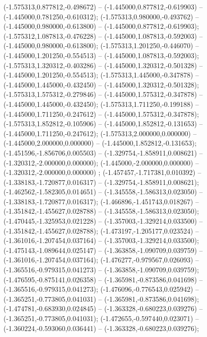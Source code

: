  (-1.575313,0.877812,-0.498672) -- (-1.445000,0.877812,-0.619903) -- (-1.445000,0.781250,-0.610312);
 (-1.575313,0.980000,-0.493762) -- (-1.445000,0.980000,-0.613800) -- (-1.445000,0.877812,-0.619903);
 (-1.575312,1.087813,-0.476228) -- (-1.445000,1.087813,-0.592003) -- (-1.445000,0.980000,-0.613800);
 (-1.575313,1.201250,-0.446070) -- (-1.445000,1.201250,-0.554513) -- (-1.445000,1.087813,-0.592003);
 (-1.575313,1.320312,-0.403286) -- (-1.445000,1.320312,-0.501328) -- (-1.445000,1.201250,-0.554513);
 (-1.575313,1.445000,-0.347878) -- (-1.445000,1.445000,-0.432450) -- (-1.445000,1.320312,-0.501328);
 (-1.575313,1.575312,-0.279846) -- (-1.445000,1.575312,-0.347878) -- (-1.445000,1.445000,-0.432450);
 (-1.575313,1.711250,-0.199188) -- (-1.445000,1.711250,-0.247612) -- (-1.445000,1.575312,-0.347878);
 (-1.575313,1.852812,-0.105906) -- (-1.445000,1.852812,-0.131653) -- (-1.445000,1.711250,-0.247612);
 (-1.575313,2.000000,0.000000) -- (-1.445000,2.000000,0.000000) -- (-1.445000,1.852812,-0.131653);
 (-1.451596,-1.856706,0.005503) -- (-1.329754,-1.858911,0.008621) -- (-1.320312,-2.000000,0.000000);
 (-1.445000,-2.000000,0.000000) -- (-1.320312,-2.000000,0.000000) ;
 (-1.457457,-1.717381,0.010392) -- (-1.338183,-1.720877,0.016317) -- (-1.329754,-1.858911,0.008621);
 (-1.462562,-1.582305,0.014651) -- (-1.345558,-1.586313,0.023050) -- (-1.338183,-1.720877,0.016317);
 (-1.466896,-1.451743,0.018267) -- (-1.351842,-1.455627,0.028788) -- (-1.345558,-1.586313,0.023050);
 (-1.470445,-1.325953,0.021228) -- (-1.357003,-1.329214,0.033500) -- (-1.351842,-1.455627,0.028788);
 (-1.473197,-1.205177,0.023524) -- (-1.361016,-1.207454,0.037164) -- (-1.357003,-1.329214,0.033500);
 (-1.475143,-1.089644,0.025147) -- (-1.363858,-1.090709,0.039759) -- (-1.361016,-1.207454,0.037164);
 (-1.476277,-0.979567,0.026093) -- (-1.365516,-0.979315,0.041273) -- (-1.363858,-1.090709,0.039759);
 (-1.476595,-0.875141,0.026358) -- (-1.365981,-0.873586,0.041698) -- (-1.365516,-0.979315,0.041273);
 (-1.476096,-0.776543,0.025942) -- (-1.365251,-0.773805,0.041031) -- (-1.365981,-0.873586,0.041698);
 (-1.474781,-0.683930,0.024845) -- (-1.363328,-0.680223,0.039276) -- (-1.365251,-0.773805,0.041031);
 (-1.472655,-0.597440,0.023071) -- (-1.360224,-0.593060,0.036441) -- (-1.363328,-0.680223,0.039276);
